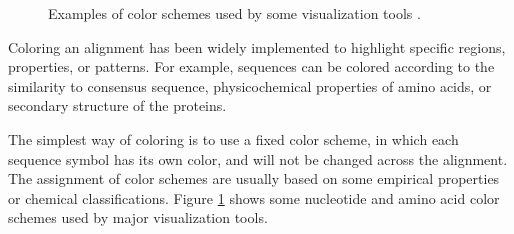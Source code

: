 \begin{figure}[hbt]
\centering
{}
\caption[Some Nucleotide and Amino Acid Color Schemes]{Examples of color schemes used by some visualization tools \cite{Procter2010aa}.}\label{fig:procter-2bc}
\end{figure}

Coloring an alignment has been widely implemented to highlight specific regions, properties, or patterns. For example, sequences can be colored according to the similarity to consensus sequence, physicochemical properties of amino acids, or secondary structure of the proteins.

The simplest way of coloring is to use a fixed color scheme, in which each sequence symbol has its own color, and will not be changed across the alignment. The assignment of color schemes are usually based on some empirical properties or chemical classifications. Figure \ref{fig:procter-2bc} shows some nucleotide and amino acid color schemes used by major visualization tools.


